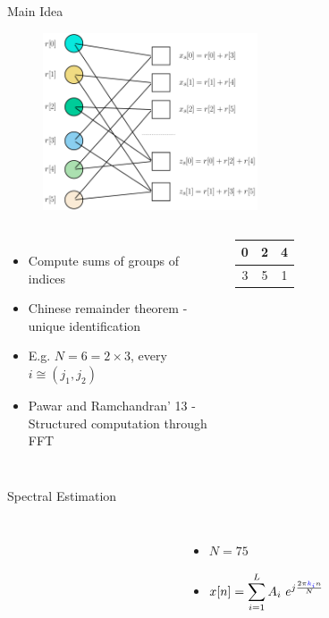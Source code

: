 \documentclass[10pt,xcolor=table]{beamer}
\begin{document}
\begin{frame}{Main Idea}
\begin{figure}[t]
\centering
\includegraphics[width=2.5in]{Factorgraph_example}
\end{figure}
\begin{columns}
\begin{itemize}
\item Compute sums of groups of indices
\item Chinese remainder theorem - unique identification
\item E.g. $N = 6 = 2 \times 3$, every $i \cong (j_1,j_2)$
\item Pawar and Ramchandran' 13 - Structured computation through FFT
\end{itemize}
\begin{tabular}{|c|c|c|}
  \hline
  0 & 2 & 4 \\
  \hline
  3 & 5 & 1 \\
  \hline
\end{tabular}
\end{columns}
\end{frame}
\begin{frame}{Spectral Estimation}
	
	\begin{columns}
		
		\begin{figure}
			\centering
			\scalebox{0.60}{}
		\end{figure}
		
		\begin{figure}
			\centering
			\scalebox{0.60}{}
		\end{figure}

        \begin{itemize}
        \item $N=75$
        \item $x[n] = \displaystyle{\sum_{i=1}^L A_i \ e^{j \frac{2 \pi {\color{blue}{k_i}} n}{N}}}$
		\end{itemize}
	\end{columns}	
\end{frame}
\end{document}

